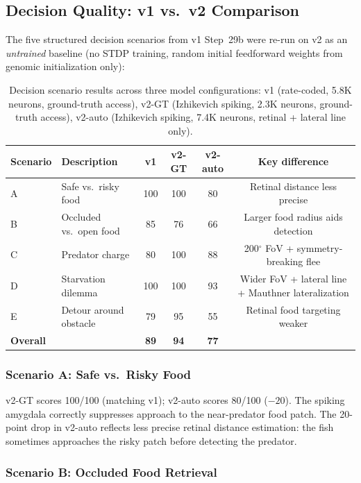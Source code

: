 \documentclass[11pt,a4paper]{article}
\begin{document}
\subsection{Decision Quality: v1 vs.\ v2 Comparison}\label{sec:decision}

The five structured decision scenarios from v1 Step~29b were re-run
on v2 as an \emph{untrained} baseline (no STDP training, random initial
feedforward weights from genomic initialization only):

\begin{table}[H]
\centering
\caption{Decision scenario results across three model configurations:
  v1 (rate-coded, 5.8K neurons, ground-truth access),
  v2-GT (Izhikevich spiking, 2.3K neurons, ground-truth access),
  v2-auto (Izhikevich spiking, 7.4K neurons, retinal + lateral line only).}
\label{tab:scenario_comparison}
\begin{tabular}{llcccc}
\toprule
Scenario & Description & v1 & v2-GT & v2-auto & Key difference \\
\midrule
A & Safe vs.\ risky food    & 100 & 100 & 80  & Retinal distance less precise \\
B & Occluded vs.\ open food &  85 &  76 & 66  & Larger food radius aids detection \\
C & Predator charge         &  80 & 100 & 88  & 200$^\circ$ FoV + symmetry-breaking flee \\
D & Starvation dilemma      & 100 & 100 & 93  & Wider FoV + lateral line + Mauthner lateralization \\
E & Detour around obstacle  &  79 &  95 & 55  & Retinal food targeting weaker \\
\midrule
\textbf{Overall} & & \textbf{89} & \textbf{94} & \textbf{77} & \\
\bottomrule
\end{tabular}
\end{table}

\subsubsection{Scenario A: Safe vs.\ Risky Food}

v2-GT scores 100/100 (matching v1); v2-auto scores 80/100 ($-20$).
The spiking amygdala correctly suppresses approach to the near-predator
food patch.
The 20-point drop in v2-auto reflects less precise retinal distance
estimation: the fish sometimes approaches the risky patch before
detecting the predator.

\subsubsection{Scenario B: Occluded Food Retrieval}
\end{document}
